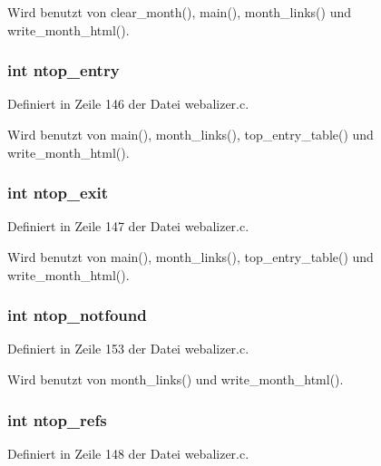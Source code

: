 Wird benutzt von clear\_\-month(), main(), month\_\-links() und write\_\-month\_\-html().
\subsubsection{\setlength{\rightskip}{0pt plus 5cm}int {\bf ntop\_\-entry}}\label{webalizer_8h_a573c7e2a32733a06a3b0dbb9430569f}




Definiert in Zeile 146 der Datei webalizer.c.

Wird benutzt von main(), month\_\-links(), top\_\-entry\_\-table() und write\_\-month\_\-html().
\subsubsection{\setlength{\rightskip}{0pt plus 5cm}int {\bf ntop\_\-exit}}\label{webalizer_8h_9d1968145275f8eb19935b5c6d5b2848}




Definiert in Zeile 147 der Datei webalizer.c.

Wird benutzt von main(), month\_\-links(), top\_\-entry\_\-table() und write\_\-month\_\-html().
\subsubsection{\setlength{\rightskip}{0pt plus 5cm}int {\bf ntop\_\-notfound}}\label{webalizer_8h_aae85fa49329c9361a901e52954764eb}




Definiert in Zeile 153 der Datei webalizer.c.

Wird benutzt von month\_\-links() und write\_\-month\_\-html().
\subsubsection{\setlength{\rightskip}{0pt plus 5cm}int {\bf ntop\_\-refs}}\label{webalizer_8h_78414d5060b40b23c1fbb95546fb74d3}




Definiert in Zeile 148 der Datei webalizer.c.

